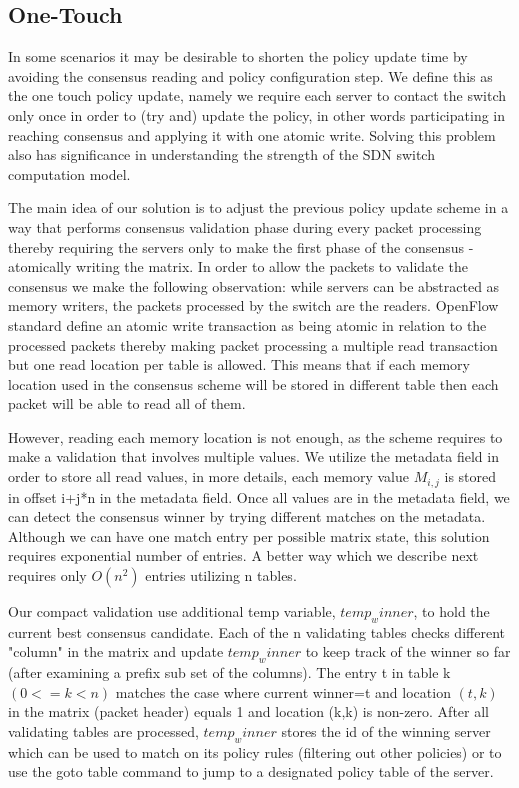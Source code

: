 \documentclass[conference]{sigcomm-alternate}
\begin{document}
\subsection{ One-Touch}

In some scenarios it may be desirable to shorten the policy update time by avoiding the consensus reading and policy configuration step. We define this as the one touch policy update, namely we require each server to contact the switch only once in order to (try and) update the policy, in other words participating in reaching consensus and applying it with one atomic write. Solving this problem also has significance in understanding the strength of the SDN switch computation model.

The main idea of our solution is to adjust the previous policy update scheme in a way that performs consensus validation phase during every packet processing thereby requiring the servers only to make the first phase of the consensus - atomically writing the matrix.
In order to allow the packets to validate the consensus we make the following observation: while servers can be abstracted as memory writers, the packets processed by the switch are the readers. OpenFlow standard define an atomic write transaction as being atomic in relation to the processed packets thereby making packet processing a multiple read transaction but one read location per table is allowed. This means that if each memory location used in the consensus scheme will be stored in different table then each packet will be able to read all of them.

However, reading each memory location is not enough, as the scheme requires to make a validation that involves multiple values. We utilize the metadata field in order to store all read values, in more details, each memory value $M_{i,j}$ is stored in offset i+j*n in the metadata field. Once all values are in the metadata field, we can detect the consensus winner by trying different matches on the metadata. Although we can have one match entry per possible matrix state, this solution requires exponential number of entries. A better way which we describe next requires only $O(n^2)$ entries utilizing n tables.

Our compact validation use additional temp variable, $temp_winner$, to hold the current best consensus candidate. Each of the n validating tables checks different "column" in the matrix and update $temp_winner$ to keep track of the winner so far (after examining a prefix sub set of the columns). The entry t in table k $(0<=k<n)$  matches the case where current winner=t and location $(t,k)$ in the matrix (packet header) equals 1 and location (k,k) is non-zero. After all validating tables are processed, $temp_winner$ stores the id of the winning server which can be used to match on its policy rules (filtering out other policies) or to use the goto table command to jump to a designated policy table of the server.
\end{document}
